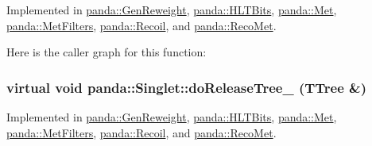 Implemented in \hyperlink{classpanda_1_1GenReweight_a0b244ad39f5b2143524a3375f4a7c726}{panda::GenReweight}, \hyperlink{classpanda_1_1HLTBits_a6851af7cebb5cb7a09aa7a76d42e5848}{panda::HLTBits}, \hyperlink{classpanda_1_1Met_a72f7fac415a4777315b1e170aa1afca4}{panda::Met}, \hyperlink{classpanda_1_1MetFilters_ad21514fd645e1f82276f055f112ad7c4}{panda::MetFilters}, \hyperlink{classpanda_1_1Recoil_a5f402f90e82af5ced6c1bc0be412e1a8}{panda::Recoil}, and \hyperlink{classpanda_1_1RecoMet_aa94e2fce017ff71bd6fcfa4f02356248}{panda::RecoMet}.

Here is the caller graph for this function:\hypertarget{classpanda_1_1Singlet_ad5acaa19bf3a8c360cf2e36604ab4530}{
\subsubsection[{doReleaseTree\_\-}]{\setlength{\rightskip}{0pt plus 5cm}virtual void panda::Singlet::doReleaseTree\_\- (TTree \&)}}
\label{classpanda_1_1Singlet_ad5acaa19bf3a8c360cf2e36604ab4530}


Implemented in \hyperlink{classpanda_1_1GenReweight_ae503dff0c490313c523e8357e5916ed6}{panda::GenReweight}, \hyperlink{classpanda_1_1HLTBits_aa18c8ff3c69a7ab522df688d5680dcdd}{panda::HLTBits}, \hyperlink{classpanda_1_1Met_a6df0a7e59b6d57c0e2b86702383f509d}{panda::Met}, \hyperlink{classpanda_1_1MetFilters_af78e81492c5936f34a5468848218396e}{panda::MetFilters}, \hyperlink{classpanda_1_1Recoil_aafbaf725b3422789edfa8eb17e6f7a52}{panda::Recoil}, and \hyperlink{classpanda_1_1RecoMet_a264ac3eeeaf567babde8c3847317bcc9}{panda::RecoMet}.

